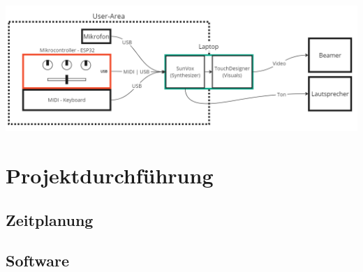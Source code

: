 \documentclass[12pt]{scrartcl}%
\theoremstyle{nonumberplain}
\begin{document}
\begin{center}
 \includegraphics[scale=0.5]{Blockschaltbild}
\end{center}

\newpage

\section{Projektdurchführung}

\subsection{Zeitplanung}

\subsection{Software}
\end{document}
